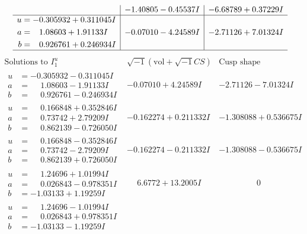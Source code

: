 \documentclass[1p]{elsarticle_modified}
\theoremstyle{definition}
\newcommand{\I}{\sqrt{-1}}
\begin{document}
$$\begin{array}{c|c|c}
 & -1.40805 - 0.45537 I & -6.68789 + 0.37229 I \\ \hline\begin{aligned}
u &= -0.305932 + 0.311045 I \\
a &= \phantom{-}1.08603 + 1.91133 I \\
b &= \phantom{-}0.926761 + 0.246934 I\end{aligned}
 & -0.07010 - 4.24589 I & -2.71126 + 7.01324 I\\
 \hline 
 \end{array}$$\newpage$$\begin{array}{c|c|c}  
\text{Solutions to }I^u_{1}& \I (\text{vol} + \sqrt{-1}CS) & \text{Cusp shape}\\
 \hline 
\begin{aligned}
u &= -0.305932 - 0.311045 I \\
a &= \phantom{-}1.08603 - 1.91133 I \\
b &= \phantom{-}0.926761 - 0.246934 I\end{aligned}
 & -0.07010 + 4.24589 I & -2.71126 - 7.01324 I \\ \hline\begin{aligned}
u &= \phantom{-}0.166848 + 0.352846 I \\
a &= \phantom{-}0.73742 + 2.79209 I \\
b &= \phantom{-}0.862139 - 0.726050 I\end{aligned}
 & -0.162274 + 0.211332 I & -1.308088 + 0.536675 I \\ \hline\begin{aligned}
u &= \phantom{-}0.166848 - 0.352846 I \\
a &= \phantom{-}0.73742 - 2.79209 I \\
b &= \phantom{-}0.862139 + 0.726050 I\end{aligned}
 & -0.162274 - 0.211332 I & -1.308088 - 0.536675 I \\ \hline\begin{aligned}
u &= \phantom{-}1.24696 + 1.01994 I \\
a &= \phantom{-}0.026843 - 0.978351 I \\
b &= -1.03133 + 1.19259 I\end{aligned}
 & \phantom{-}6.6772 + 13.2005 I & \phantom{-0.000000 } 0 \\ \hline\begin{aligned}
u &= \phantom{-}1.24696 - 1.01994 I \\
a &= \phantom{-}0.026843 + 0.978351 I \\
b &= -1.03133 - 1.19259 I\end{aligned}

\end{array}$$
\end{document}
